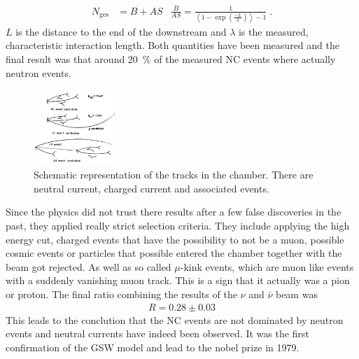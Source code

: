 \begin{align*}
  N_{\text{ges}} &= B + AS & \frac{B}{AS} = \frac{1}{\left< 1- \exp\left( \frac{-L}{\lambda} \right)\right> -1}\;.
\end{align*}
$L$ is the distance to the end of the downstream and $\lambda$ is the measured, characteristic interaction length. Both quantities have been measured and the final result was that around \SI{20}{\percent} of the measured NC events where actually neutron events.
	\begin{figure}
	    \includegraphics[width=0.28\textwidth]{graphics/CC_NC_AS.png}
	    \caption{Schematic representation of the tracks in the chamber. There are neutral current, charged current and associated events. \cite{NC_J}}
			\label{fig:NCCCAS}
	  \end{figure}
	  \FloatBarrier

Since the physics did not trust there results after a few false discoveries in the past, they applied really strict selection criteria. They include applying the high energy cut, charged events that have the possibility to not be a muon, possible cosmic events or particles that possible entered the chamber together with the beam got rejected. As well as so called $\mu$-kink events, which are muon like events with a suddenly vanishing muon track. This is a sign that it actually was a pion or proton.
The final ratio combining the results of the $\nu$ and $\bar{\nu}$ beam was
\begin{align*}
	R = 0.28 \pm 0.03
\end{align*}
This leads to the conclution that the NC events are not dominated by neutron events and neutral currents have indeed been observed. It was the first confirmation of the GSW model and lead to the nobel prize in 1979.
